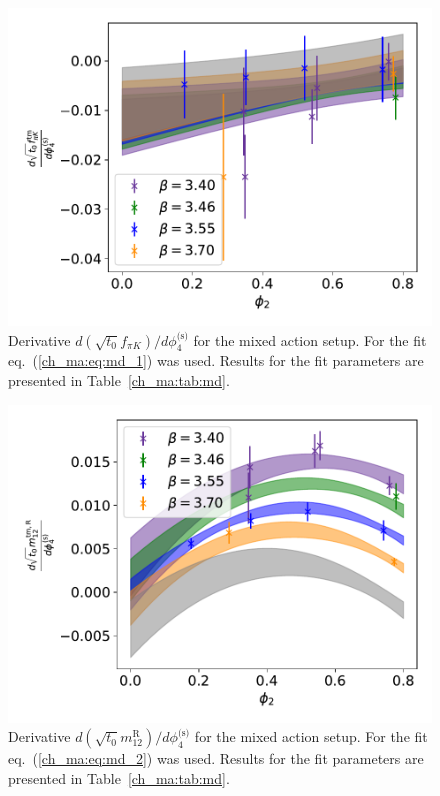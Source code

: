 \begin{figure}
    \centering
    \includegraphics[width=1.\textwidth]{./cap4/figs/dt0fpik_tm.pdf}
    \caption{Derivative $d\left(\sqrt{t_0}f_{\pi K}\right)/d\phi_4^{\textrm{(s)}}$ for the mixed action setup. For the fit eq.~(\ref{ch_ma:eq:md_1}) was used. Results for the fit parameters are presented in Table~\ref{ch_ma:tab:md}.}
    \label{ch_ma:fig:dfpik_tm}
\end{figure}

\begin{figure}
    \centering
    \includegraphics[width=1.\textwidth]{./cap4/figs/dt0m12_tm.pdf}
    \caption{Derivative $d\left(\sqrt{t_0}m_{12}^{\textrm{R}}\right)/d\phi_4^{\textrm{(s)}}$ for the mixed action setup. For the fit eq.~(\ref{ch_ma:eq:md_2}) was used. Results for the fit parameters are presented in Table~\ref{ch_ma:tab:md}.}
    \label{ch_ma:fig:dm12_tm}
\end{figure}

